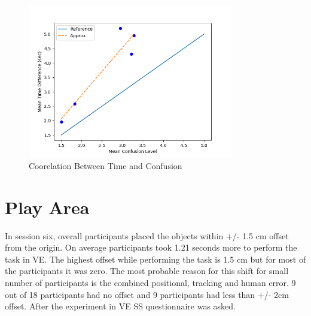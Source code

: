 \begin{figure}[h]
    \centering
    \includegraphics[width=0.8\textwidth]{./images/corelation.png}
    \caption{Coorelation Between Time and Confusion}
    \label{fig:corelation}
\end{figure}

\section{Play Area}
In session six, overall participants placed the objects within +/- 1.5 cm offset from the origin. On average participants took 1.21 seconds more to perform the task in VE. The highest offset while performing the task is 1.5 cm but for most of the participants it was zero. The most probable reason for this shift for small number of participants is the combined positional, tracking and human error. 9 out of 18 participants had no offset and 9 participants had less than +/- 2cm offset. After the experiment in VE SS questionnaire was asked. 


